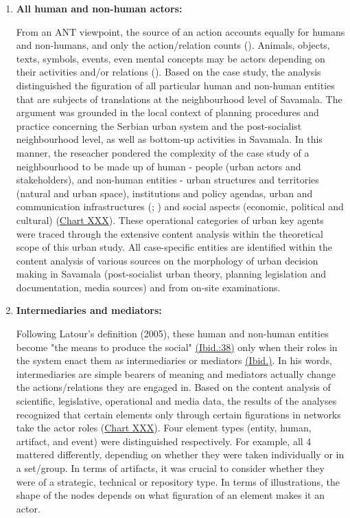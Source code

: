 \documentclass[11pt]{report}
\begin{document}
\begin{enumerate}
\item \textbf{All human and non-human actors:}

From an ANT viewpoint, the source of an action accounts equally for humans and non-humans, and only the action/relation counts (\href{Latour}{\citealt{latour_actor-network_1996}}). Animals, objects, texts, symbols, events, even mental concepts may be actors depending on their activities and/or relations (\href{Cerulo}{\citealt{cerulo_nonhumans_2009}}).
Based on the case study, the analysis distinguished the figuration of all particular human and non-human entities that are subjects of translations at the neighbourhood level of Savamala. The argument was grounded in the local context of planning procedures and practice concerning the Serbian urban system and the post-socialist neighbourhood level, as well as bottom-up activities in Savamala. In this manner, the reseacher pondered the complexity of the case study of a neighbourhood to be made up of human - people (urban actors and stakeholders), and non-human entities - urban structures and territories (natural and urban space), institutions and policy agendas, urban and communication infrastructures (\href{Mitchell}{\citealt{mitchell_city_1996}}; \href{Firmino}{\citealt{firmino_pervasive_2008}}) and social aspects (economic, political and cultural) (\href{Table ANT discource analysos}{Chart XXX}). These operational categories of urban key agents were traced through the extensive content analysis within the theoretical scope of this urban study. All case-specific entities are identified within the content analysis of various sources on the morphology of urban decision making in Savamala (post-socialist urban theory, planning legislation and documentation, media sources) and from on-site examinations.

\item \textbf{Intermediaries and mediators:}

Following Latour’s definition (2005), these human and non-human entities become "the means to produce the social" \href{ref}{(Ibid.:38)} only when their roles in the system enact them as intermediaries or mediators \href{ref}{(Ibid.)}. In his words, intermediaries are simple bearers of meaning and mediators actually change the actions/relations they are engaged in. Based on the content analysis of scientific, legislative, operational and media data, the results of the analyses recognized that certain elements only through certain figurations in networks take the actor roles (\href{Table ANT discource analysis}{Chart XXX}). Four element types (entity, human, artifact, and event) were distinguished respectively. For example, all 4 mattered differently, depending on whether they were taken individually or in a set/group. In terms of artifacts, it was crucial to consider whether they were of a strategic, technical or repository type. In terms of illustrations, the shape of the nodes depends on what figuration of an element makes it an actor.


\end{enumerate}
\end{document}
